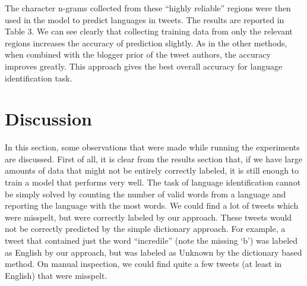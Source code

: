 \documentclass[11pt]{article}
\begin{document}

The character n-grams collected from these ``highly reliable'' regions were then used in the model to predict languages in tweets. The results are reported in Table 3. We can see clearly that collecting training data from only the relevant regions increases the accuracy of prediction slightly. As in the other methods, when combined with the blogger prior of the tweet authors, the accuracy improves greatly. This approach gives the best overall accuracy for language identification task.

\section {Discussion}
In this section, some observations that were made while running the experiments are discussed. First of all, it is clear from the results section that, if we have large amounts of data that might not be entirely correctly labeled, it is still enough to train a model that performs very well. The task of language identification cannot be simply solved by counting the number of valid words from a language and reporting the language with the most words. We could find a lot of tweets which were misspelt, but were correctly labeled by our approach. These tweets would not be correctly predicted by the simple dictionary approach. For example, a tweet that contained just the word ``incredile'' (note the missing `b') was labeled as English by our approach, but was labeled as Unknown by the dictionary based method. On manual inspection, we could find quite a few tweets (at least in English) that were misspelt.
\end{document}
